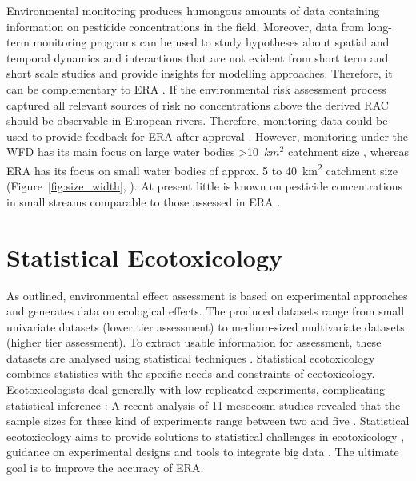 Environmental monitoring produces humongous amounts of data containing information on pesticide concentrations in the field.
Moreover, data from long-term monitoring programs can be used to study hypotheses about spatial and temporal dynamics and interactions that are not evident from short term and short scale studies \citep{gitzen_design_2012} and provide insights for modelling approaches. 
Therefore, it can be complementary to ERA \citep{suter_ecological_2007}.
If the environmental risk assessment process captured all relevant sources of risk no concentrations above the derived RAC should be observable in European rivers. 
Therefore, monitoring data could be used to provide feedback for ERA after approval \citep{knauer_pesticides_2016}. 
However, monitoring under the WFD has its main focus on large water bodies \textgreater 10~$km^2$ catchment size \citep{european_union_directive_2000}, whereas ERA has its focus on small water bodies of approx. 5 to 40~km\textsuperscript{2} catchment size (Figure~\ref{fig:size_width}, \citet{european_union_regulation_2009, brock_aquatic_2006}).
At present little is known on pesticide concentrations in small streams comparable to those assessed in ERA \citep{lorenz_specifics_2016, biggs_importance_2016}. 



\section{Statistical Ecotoxicology}

As outlined, environmental effect assessment is based on experimental approaches and generates data on ecological effects.
The produced datasets range from small univariate datasets (lower tier assessment) to medium-sized multivariate datasets (higher tier assessment).
To extract usable information for assessment, these datasets are analysed using statistical techniques \citep{newman_quantitative_2012}. 
Statistical ecotoxicology combines statistics with the specific needs and constraints of ecotoxicology. 
Ecotoxicologists deal generally with low replicated experiments, complicating statistical inference \citep{van_der_hoeven_power_1998}:
A recent analysis of 11 mesocosm studies revealed that the sample sizes for these kind of experiments range between two and five \citep{szocs_analysing_2015}.
Statistical ecotoxicology aims to provide solutions to statistical challenges in ecotoxicology \citep{fox_comment_2016}, guidance on experimental designs \citep{johnson_power_2015} and tools to integrate big data \citep {van_den_brink_new_2016}.
The ultimate goal is to improve the accuracy of ERA. 

